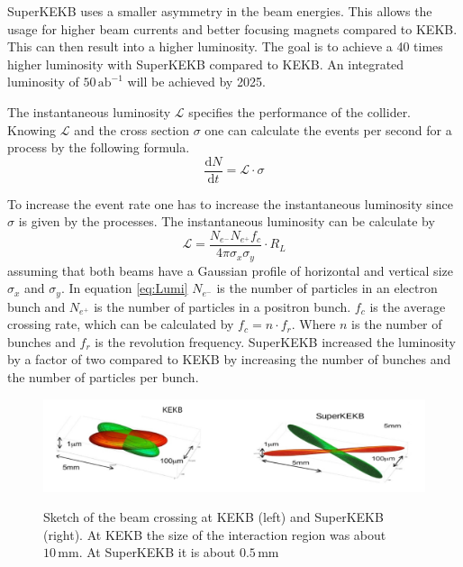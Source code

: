 \documentclass[a4paper,11pt,oneside,final,german,openbib,pdftex]{scrbook}
\begin{document}
SuperKEKB uses a smaller asymmetry in the beam energies. This allows the usage for higher beam currents and better focusing magnets compared to KEKB. This can then result into a higher luminosity. The goal is to achieve a 40 times higher luminosity with SuperKEKB compared to KEKB.
An integrated luminosity of $50\,\textrm{ab}^{-1}$ will be achieved by 2025.\cite{Belle2Book}

The instantaneous luminosity $\mathcal{L}$ specifies the performance of the collider. Knowing $\mathcal{L} $ and the cross section $\sigma$ one can calculate the events per second for a process by the following formula.
\begin{equation}
\frac{\textrm{d}N}{\textrm{d}t} = \mathcal{L} \cdot \sigma
\end{equation} 

To increase the event rate one has to increase the instantaneous luminosity since $\sigma$ is given by the processes. The instantaneous luminosity can be calculate by
\begin{equation}
	\mathcal{L} = \frac{N_{e^-}N_{e^+}f_c}{4\pi \sigma_x \sigma_y} \cdot R_L
	\label{eq:Lumi}
\end{equation}
 assuming that both beams have a Gaussian profile of horizontal and vertical size $\sigma_x$ and $\sigma_y$. In equation \ref{eq:Lumi} $N_{e^-}$ is the number of particles in an electron bunch and $N_{e^+}$ is the number of particles in a positron bunch. $f_c$ is the average crossing rate, which can be calculated by $f_c = n \cdot f_r$. Where $n$ is the number of bunches and $f_r$ is the revolution frequency. SuperKEKB increased the luminosity by a factor of two compared to KEKB by increasing the number of bunches and the number of particles per bunch.
 
\begin{figure}[h!]
	\centering
	\includegraphics[width=14.5cm]{Bilder/bsSKEK}
	\label{fig:beamsize}
	\caption{Sketch of the beam crossing at KEKB (left) and SuperKEKB (right). At KEKB the size of the interaction region was about $10\,\textrm{mm}$. At SuperKEKB it is about $0.5\,\textrm{mm}$}
\end{figure}
\end{document}
